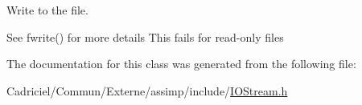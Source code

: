 Write to the file. 

See fwrite() for more details This fails for read-\/only files 

The documentation for this class was generated from the following file\-:\begin{DoxyCompactItemize}
\item 
Cadriciel/\-Commun/\-Externe/assimp/include/\hyperlink{_i_o_stream_8h}{I\-O\-Stream.\-h}\end{DoxyCompactItemize}

